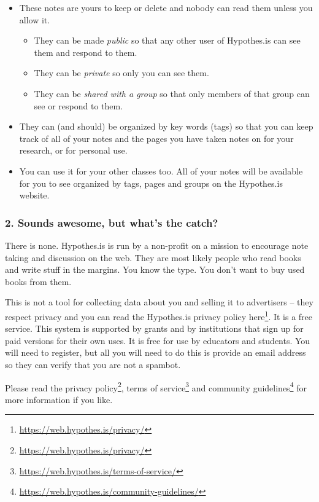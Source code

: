 \documentclass[
  12pt, openany]{book}
\providecommand{\tightlist}{%
  \setlength{\itemsep}{0pt}\setlength{\parskip}{0pt}}
\renewcommand{\href}[2]{#2\footnote{\url{#1}}}
\begin{document}
\begin{itemize}
\item
  These notes are yours to keep or delete and nobody can read them unless you allow it.

  \begin{itemize}
  \tightlist
  \item
    They can be made \emph{public} so that any other user of Hypothes.is can see them and respond to them.
  \item
    They can be \emph{private} so only you can see them.
  \item
    They can be \emph{shared with a group} so that only members of that group can see or respond to them.
  \end{itemize}
\item
  They can (and should) be organized by key words (tags) so that you can keep track of all of your notes and the pages you have taken notes on for your research, or for personal use.
\item
  You can use it for your other classes too. All of your notes will be available for you to see organized by tags, pages and groups on the Hypothes.is website.
\end{itemize}

\hypertarget{sounds-awesome-but-whats-the-catch}{%
\subsubsection*{2. Sounds awesome, but what's the catch?}\label{sounds-awesome-but-whats-the-catch}}


There is none. Hypothes.is is run by a non-profit on a mission to encourage note taking and discussion on the web. They are most likely people who read books and write stuff in the margins. You know the type. You don't want to buy used books from them.

This is not a tool for collecting data about you and selling it to advertisers -- they respect privacy and you can read \href{https://web.hypothes.is/privacy/}{the Hypothes.is privacy policy here}. It is a free service. This system is supported by grants and by institutions that sign up for paid versions for their own uses. It is free for use by educators and students. You will need to register, but all you will need to do this is provide an email address so they can verify that you are not a spambot.

Please read the \href{https://web.hypothes.is/privacy/}{privacy policy}, \href{https://web.hypothes.is/terms-of-service/}{terms of service} and \href{https://web.hypothes.is/community-guidelines/}{community guidelines} for more information if you like.
\end{document}
